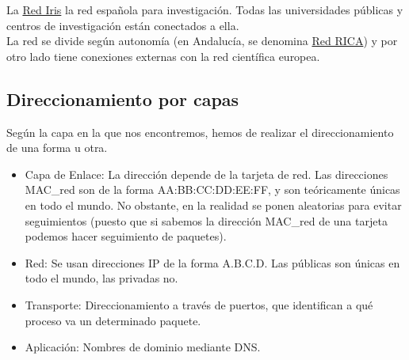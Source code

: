 La \href{https://www.rediris.es/}{Red Iris} la red española para investigación. Todas las universidades públicas y centros de investigación están conectados a ella. \\

La red se divide según autonomía (en Andalucía, se denomina \href{https://www.cica.es/red-rica/trafico-rica/}{Red RICA}) y por otro lado tiene conexiones externas con la red científica europea. 


\subsection{Direccionamiento por capas}
Según la capa en la que nos encontremos, hemos de realizar el direccionamiento de una forma u otra.
\begin{itemize}
    \item Capa de Enlace: La dirección depende de la tarjeta de red. Las direcciones \acrshort{MAC_red} son de la forma AA\@:BB\@:CC\@:DD\@:EE\@:FF\@, y son teóricamente únicas en todo el mundo. No obstante, en la realidad se ponen aleatorias para evitar seguimientos (puesto que si sabemos la dirección \acrshort{MAC_red} de una tarjeta podemos hacer seguimiento de paquetes).
    \item Red: Se usan direcciones \acrshort{IP} de la forma A\@.B\@.C\@.D\@. Las públicas son únicas en todo el mundo, las privadas no.
    \item Transporte: Direccionamiento a través de puertos, que identifican a qué proceso va un determinado paquete. 
    \item Aplicación: Nombres de dominio mediante \acrshort{DNS}.
\end{itemize}